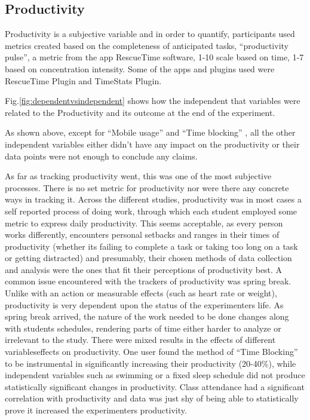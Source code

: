 \subsection{Productivity}


Productivity is a subjective variable and in order to quantify, participants used metrics created based on the completeness of anticipated tasks, \enquote{productivity pulse}, a metric from the app RescueTime software, 1-10 scale based on time, 1-7 based on concentration intensity. Some of the apps and plugins used were RescueTime Plugin  and TimeStats Plugin.

Fig.\ref{fig:dependentvsindependent} shows how the independent that variables were related to the Productivity and its outcome at the end of the experiment.

As shown above, except for \enquote{Mobile usage} and \enquote{Time blocking} \cite{timeblocking}, all the other independent variables either didn’t have any impact on the productivity or their data points were not enough to conclude any claims.

As far as tracking productivity went, this was one of the most subjective processes.  There is no set metric for productivity nor were there any concrete ways in tracking it.  Across the different studies, productivity was in most cases a self reported process of doing work, through which each student employed some metric to express daily productivity.  This seems acceptable, as every person works differently, encounters personal setbacks and ranges in their times of productivity (whether it\textquotesingle s failing to complete a task or taking too long on a task or getting distracted) and presumably, their chosen methods of data collection and analysis were the ones that fit their perceptions of productivity best.  A common issue encountered with the trackers of productivity was spring break.  Unlike with an action or measurable effects (such as heart rate or weight), productivity is very dependent upon the status of the experimenter\textquotesingle s life.  As spring break arrived, the nature of the work needed to be done changes along with students schedules, rendering parts of time either harder to analyze or irrelevant to the study.  There were mixed results in the effects of different variables\textquotesingle  effects on productivity.  One user found the method of \enquote{Time Blocking} \cite{timeblocking} to be instrumental in significantly increasing their productivity (20-40\%), while independent variables such as swimming or a fixed sleep schedule did not produce statistically significant changes in productivity.  Class attendance had a significant correlation with productivity and data was just shy of being able to statistically prove it increased the experimenter\textquotesingle s productivity. 


